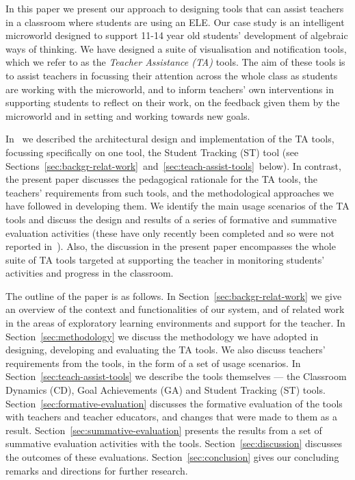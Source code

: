 In this paper we present our approach to designing tools that can assist
teachers in a classroom where students are using an ELE. 
Our case study is an intelligent microworld designed to
support 11-14 year old students' development of algebraic ways of thinking. 
We have designed a suite of visualisation and notification
tools, which we refer to as the {\em Teacher Assistance (TA)}
tools. The aim of these tools is to assist teachers in focussing their 
attention across the whole class as students are working with the microworld,
and to inform teachers' own interventions in supporting students to reflect on
their work, on the feedback given them by the microworld and in setting
and working towards new goals. 

In~\cite{PearceLazard2010Design,IEEE-TLT-TA} we described the architectural design
and implementation of the TA tools, focussing specifically on 
one tool, the Student Tracking (ST) tool (see
Sections~\ref{sec:backgr-relat-work}~and~\ref{sec:teach-assist-tools}~below). 
In contrast, the present paper discusses the pedagogical rationale for
the TA tools, the teachers' requirements from such tools, and the methodological
approaches we have followed in developing them. We identify the main
usage scenarios of the TA tools and discuss the design and results of
a series of formative and summative evaluation activities (these have
only recently been completed and so were not reported
in~\cite{PearceLazard2010Design,IEEE-TLT-TA}).  
Also, the discussion in the present paper encompasses the whole suite of 
TA tools targeted at supporting the teacher in monitoring 
students' activities and progress in the classroom.
 
The outline of the paper is as follows. In
Section~\ref{sec:backgr-relat-work}  we give an
overview of the context and functionalities of our system, and
of related work in the areas of exploratory learning environments and
support for the teacher. In Section~\ref{sec:methodology}
we discuss the methodology we
have adopted in designing, developing and evaluating the TA tools. We
also discuss teachers' requirements from the tools, in the form of
a set of usage scenarios. In Section~\ref{sec:teach-assist-tools}
we describe the tools
themselves --- the Classroom Dynamics (CD), Goal Achievements (GA) and
Student Tracking (ST) tools. Section~\ref{sec:formative-evaluation} 
discusses the formative evaluation of the tools with teachers and 
teacher educators, and changes that were made to them as a result.
Section~\ref{sec:summative-evaluation} 
presents the results from a set of summative
evaluation activities with the tools.
Section~\ref{sec:discussion} discusses the outcomes of these
evaluations. 
Section~\ref{sec:conclusion} 
gives our concluding remarks and directions
for further research.


